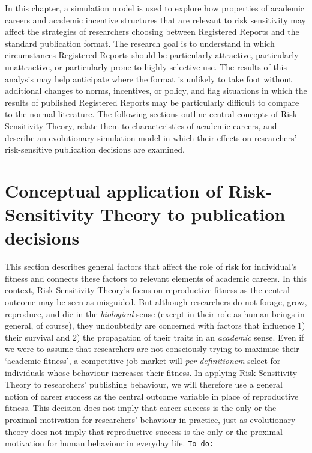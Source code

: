 \documentclass[
  ,man,mask,floatsintext]{apa6}
\begin{document}
In this chapter, a simulation model is used to explore how properties of academic careers and academic incentive structures that are relevant to risk sensitivity may affect the strategies of researchers choosing between Registered Reports and the standard publication format.
The research goal is to understand in which circumstances Registered Reports should be particularly attractive, particularly unattractive, or particularly prone to highly selective use.
The results of this analysis may help anticipate where the format is unlikely to take foot without additional changes to norms, incentives, or policy, and flag situations in which the results of published Registered Reports may be particularly difficult to compare to the normal literature.
The following sections outline central concepts of Risk-Sensitivity Theory, relate them to characteristics of academic careers, and describe an evolutionary simulation model in which their effects on researchers' risk-sensitive publication decisions are examined.

\hypertarget{conceptual-application-of-risk-sensitivity-theory-to-publication-decisions}{%
\section{Conceptual application of Risk-Sensitivity Theory to publication decisions}\label{conceptual-application-of-risk-sensitivity-theory-to-publication-decisions}}

This section describes general factors that affect the role of risk for individual's fitness and connects these factors to relevant elements of academic careers.
In this context, Risk-Sensitivity Theory's focus on reproductive fitness as the central outcome may be seen as misguided.
But although researchers do not forage, grow, reproduce, and die in the \emph{biological} sense (except in their role as human beings in general, of course), they undoubtedly are concerned with factors that influence 1) their survival and 2) the propagation of their traits in an \emph{academic} sense.
Even if we were to assume that researchers are not consciously trying to maximise their `academic fitness', a competitive job market will \emph{per definitionem} select for individuals whose behaviour increases their fitness.
In applying Risk-Sensitivity Theory to researchers' publishing behaviour, we will therefore use a general notion of career success as the central outcome variable in place of reproductive fitness.
This decision does not imply that career success is the only or the proximal motivation for researchers' behaviour in practice, just as evolutionary theory does not imply that reproductive success is the only or the proximal motivation for human behaviour in everyday life.
\texttt{To\ do:}
\end{document}
